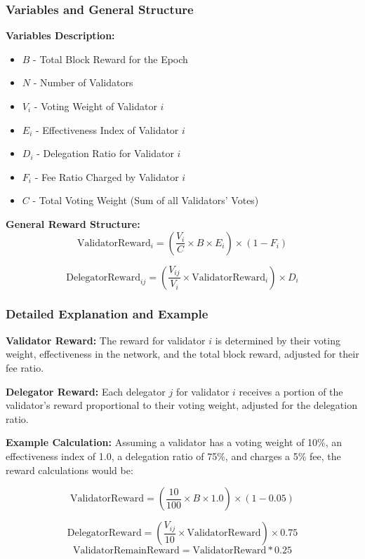 \documentclass{beamer}
\begin{document}
\begin{frame}
\frametitle{Variables and General Structure}
\scriptsize
\textbf{Variables Description:}
\begin{itemize}
  \item \( B \) - Total Block Reward for the Epoch
  \item \( N \) - Number of Validators
  \item \( V_i \) - Voting Weight of Validator \( i \)
  \item \( E_i \) - Effectiveness Index of Validator \( i \)
  \item \( D_i \) - Delegation Ratio for Validator \( i \)
  \item \( F_i \) - Fee Ratio Charged by Validator \( i \)
  \item \( C \) - Total Voting Weight (Sum of all Validators' Votes)
\end{itemize}

\textbf{General Reward Structure:}
\begin{equation}
\text{ValidatorReward}_i = \left( \frac{V_i}{C} \times B \times E_i \right) \times (1 - F_i)
\end{equation}

\begin{equation}
\text{DelegatorReward}_{ij} = \left( \frac{V_{ij}}{V_i} \times \text{ValidatorReward}_i \right) \times D_i
\end{equation}
\end{frame}


\begin{frame}
\frametitle{Detailed Explanation and Example}
\scriptsize
\textbf{Validator Reward:}
The reward for validator \( i \) is determined by their voting weight, effectiveness in the network, and the total block reward, adjusted for their fee ratio.

\textbf{Delegator Reward:}
Each delegator \( j \) for validator \( i \) receives a portion of the validator's reward proportional to their voting weight, adjusted for the delegation ratio.

\textbf{Example Calculation:}
Assuming a validator has a voting weight of 10\%, an effectiveness index of 1.0, a delegation ratio of 75\%, and charges a 5\% fee, the reward calculations would be:

\begin{equation}
\text{ValidatorReward} = \left( \frac{10}{100} \times B \times 1.0 \right) \times (1 - 0.05) 
\end{equation}

\begin{equation}
\text{DelegatorReward} = \left( \frac{V_{ij}}{10} \times \text{ValidatorReward} \right) \times 0.75
\end{equation}
\begin{equation}
\text{ValidatorRemainReward} = \text{ValidatorReward}*0.25 
\end{equation}
\end{frame}
\end{document}
